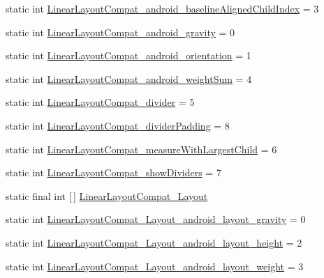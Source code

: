 \begin{DoxyCompactItemize}
\item 
static int \hyperlink{classandroid_1_1support_1_1v7_1_1appcompat_1_1R_1_1styleable_af06bece97e887762a7014b0f2cc556b3}{Linear\+Layout\+Compat\+\_\+android\+\_\+baseline\+Aligned\+Child\+Index} = 3
\item 
static int \hyperlink{classandroid_1_1support_1_1v7_1_1appcompat_1_1R_1_1styleable_a1a79155cc159491b1b7a5cdcc1151129}{Linear\+Layout\+Compat\+\_\+android\+\_\+gravity} = 0
\item 
static int \hyperlink{classandroid_1_1support_1_1v7_1_1appcompat_1_1R_1_1styleable_a72c55918aae02ccc8eedaf1fd22650d0}{Linear\+Layout\+Compat\+\_\+android\+\_\+orientation} = 1
\item 
static int \hyperlink{classandroid_1_1support_1_1v7_1_1appcompat_1_1R_1_1styleable_af4156d93fb0f23063721a22e35a2d57f}{Linear\+Layout\+Compat\+\_\+android\+\_\+weight\+Sum} = 4
\item 
static int \hyperlink{classandroid_1_1support_1_1v7_1_1appcompat_1_1R_1_1styleable_aea914902102e3572b7009f55ad727a9b}{Linear\+Layout\+Compat\+\_\+divider} = 5
\item 
static int \hyperlink{classandroid_1_1support_1_1v7_1_1appcompat_1_1R_1_1styleable_aaa2b07fcbbf44f3762755b98ba2e1415}{Linear\+Layout\+Compat\+\_\+divider\+Padding} = 8
\item 
static int \hyperlink{classandroid_1_1support_1_1v7_1_1appcompat_1_1R_1_1styleable_a6d10c5bf4d8bc31c3f749f3b7a15cb79}{Linear\+Layout\+Compat\+\_\+measure\+With\+Largest\+Child} = 6
\item 
static int \hyperlink{classandroid_1_1support_1_1v7_1_1appcompat_1_1R_1_1styleable_a18ec21806877ae05158a519df038e895}{Linear\+Layout\+Compat\+\_\+show\+Dividers} = 7
\item 
static final int \mbox{[}$\,$\mbox{]} \hyperlink{classandroid_1_1support_1_1v7_1_1appcompat_1_1R_1_1styleable_abdf078c09964c82c7af689bed5e6f564}{Linear\+Layout\+Compat\+\_\+\+Layout}
\item 
static int \hyperlink{classandroid_1_1support_1_1v7_1_1appcompat_1_1R_1_1styleable_a74cba1962f48bb8a5e322a56f2701a54}{Linear\+Layout\+Compat\+\_\+\+Layout\+\_\+android\+\_\+layout\+\_\+gravity} = 0
\item 
static int \hyperlink{classandroid_1_1support_1_1v7_1_1appcompat_1_1R_1_1styleable_ab19ac17e3b2ed7081664217655762b35}{Linear\+Layout\+Compat\+\_\+\+Layout\+\_\+android\+\_\+layout\+\_\+height} = 2
\item 
static int \hyperlink{classandroid_1_1support_1_1v7_1_1appcompat_1_1R_1_1styleable_a736d65ca5304ffad4894d0eda896ee4e}{Linear\+Layout\+Compat\+\_\+\+Layout\+\_\+android\+\_\+layout\+\_\+weight} = 3

\end{DoxyCompactItemize}
